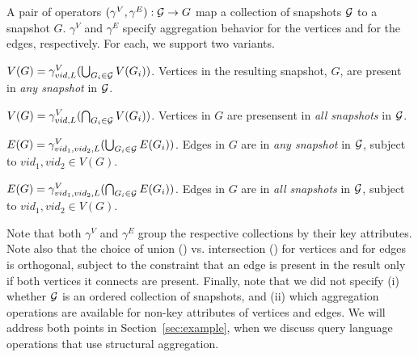 \begin{definition}   
A pair of operators $(\gamma^{V}, \gamma^{E}) : {\cal G} \rightarrow
G$ map a collection of snapshots $\cal{G}$ to a snapshot $G$.
$\gamma^{V}$ and $\gamma^{E}$ specify aggregation behavior for the
vertices and for the edges, respectively.  For each, we support two
variants.

\insql{[Any V]} $V(G) = \gamma^{V}_{vid, L}(\bigcup_{G_i \in {\cal G}} V(G_i))$.
Vertices in the resulting snapshot, $G$, are present in {\em any
  snapshot} in ${\cal G}$.

\insql{[All V]} $V(G) = \gamma^{V}_{vid, L}(\bigcap_{G_i \in {\cal G}} V(G_i))$.
Vertices in $G$ are presensent in {\em all snapshots} in ${\cal G}$.

\insql{[Any E]} $E(G) = \gamma^{V}_{vid_1,vid_2, L}(\bigcup_{G_i \in {\cal G}} E(G_i))$.
  Edges in $G$ are in {\em any snapshot} in ${\cal G}$,
  subject to $vid_1, vid_2 \in V(G)$.

\insql{[All E]} $E(G) = \gamma^{V}_{vid_1,vid_2, L}(\bigcap_{G_i \in
  {\cal G}} E(G_i))$.  Edges in $G$ are in {\em all snapshots} in
${\cal G}$, subject to $vid_1, vid_2 \in V(G)$.

\label{def:sgroup}
\end{definition}

Note that both $\gamma^{V}$ and $\gamma^{E}$ group the respective
collections by their key attributes.  Note also that the choice of
union () vs. intersection () for vertices and
for edges is orthogonal, subject to the constraint that an edge is
present in the result only if both vertices it connects are present.
Finally, note that we did not specify (i) whether ${\cal G}$ is an
ordered collection of snapshots, and (ii) which aggregation operations
are available for non-key attributes of vertices and edges.  We will
address both points in Section~\ref{sec:example}, when we discuss
query language operations that use structural aggregation.

